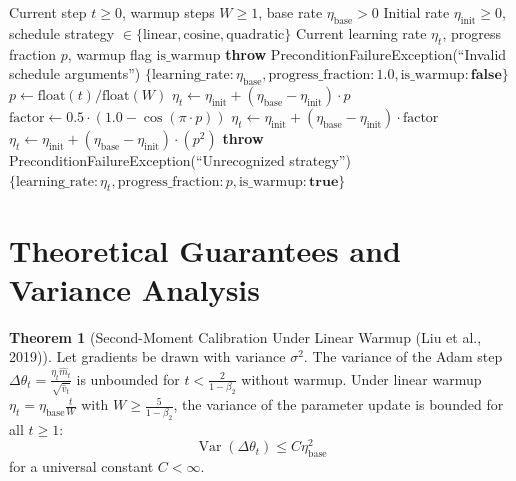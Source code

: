 \documentclass[11pt,a4paper]{article}
\theoremstyle{definition}
\newtheorem{theorem}{Theorem}[section]
\begin{document}
\begin{algorithm}[H]
\caption{Learning Rate Warmup Step Computation}
\begin{algorithmic}[1]
\Require Current step $t \ge 0$, warmup steps $W \ge 1$, base rate $\eta_{\text{base}} > 0$
\Require Initial rate $\eta_{\text{init}} \ge 0$, schedule strategy $\in \{\text{linear}, \text{cosine}, \text{quadratic}\}$
\Ensure Current learning rate $\eta_t$, progress fraction $p$, warmup flag $\text{is\_warmup}$
    \State \textbf{throw} PreconditionFailureException(``Invalid schedule arguments'')
\EndIf
{}
    \State \Return $\{\text{learning\_rate}: \eta_{\text{base}}, \text{progress\_fraction}: 1.0, \text{is\_warmup}: \textbf{false}\}$
\EndIf
\State $p \gets \text{float}(t) / \text{float}(W)$
    \State $\eta_t \gets \eta_{\text{init}} + (\eta_{\text{base}} - \eta_{\text{init}}) \cdot p$
    \State $\text{factor} \gets 0.5 \cdot (1.0 - \cos(\pi \cdot p))$
    \State $\eta_t \gets \eta_{\text{init}} + (\eta_{\text{base}} - \eta_{\text{init}}) \cdot \text{factor}$
    \State $\eta_t \gets \eta_{\text{init}} + (\eta_{\text{base}} - \eta_{\text{init}}) \cdot (p^2)$
\Else
    \State \textbf{throw} PreconditionFailureException(``Unrecognized strategy'')
\EndIf
\State \Return $\{\text{learning\_rate}: \eta_t, \text{progress\_fraction}: p, \text{is\_warmup}: \textbf{true}\}$
\end{algorithmic}
\end{algorithm}

\section{Theoretical Guarantees and Variance Analysis}

\begin{theorem}[Second-Moment Calibration Under Linear Warmup (Liu et al., 2019)]
Let gradients be drawn with variance $\sigma^2$. The variance of the Adam step $\Delta \theta_t = \frac{\eta_t \hat{m}_t}{\sqrt{\hat{v}_t}}$ is unbounded for $t < \frac{2}{1 - \beta_2}$ without warmup. Under linear warmup $\eta_t = \eta_{\text{base}} \frac{t}{W}$ with $W \ge \frac{5}{1 - \beta_2}$, the variance of the parameter update is bounded for all $t \ge 1$:
\begin{equation}
\operatorname{Var}(\Delta \theta_t) \le C \eta_{\text{base}}^2
\end{equation}
for a universal constant $C < \infty$.
\end{theorem}
\end{document}
